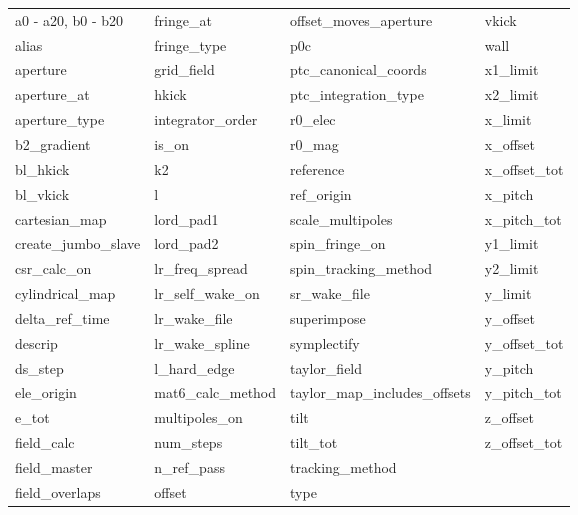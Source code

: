  \begin{tabular}{llll} \toprule
a0 - a20, b0 - b20          & fringe_at                   & offset_moves_aperture       & vkick                       \\
alias                       & fringe_type                 & p0c                         & wall                        \\
aperture                    & grid_field                  & ptc_canonical_coords        & x1_limit                    \\
aperture_at                 & hkick                       & ptc_integration_type        & x2_limit                    \\
aperture_type               & integrator_order            & r0_elec                     & x_limit                     \\
b2_gradient                 & is_on                       & r0_mag                      & x_offset                    \\
bl_hkick                    & k2                          & reference                   & x_offset_tot                \\
bl_vkick                    & l                           & ref_origin                  & x_pitch                     \\
cartesian_map               & lord_pad1                   & scale_multipoles            & x_pitch_tot                 \\
create_jumbo_slave          & lord_pad2                   & spin_fringe_on              & y1_limit                    \\
csr_calc_on                 & lr_freq_spread              & spin_tracking_method        & y2_limit                    \\
cylindrical_map             & lr_self_wake_on             & sr_wake_file                & y_limit                     \\
delta_ref_time              & lr_wake_file                & superimpose                 & y_offset                    \\
descrip                     & lr_wake_spline              & symplectify                 & y_offset_tot                \\
ds_step                     & l_hard_edge                 & taylor_field                & y_pitch                     \\
ele_origin                  & mat6_calc_method            & taylor_map_includes_offsets & y_pitch_tot                 \\
e_tot                       & multipoles_on               & tilt                        & z_offset                    \\
field_calc                  & num_steps                   & tilt_tot                    & z_offset_tot                \\
field_master                & n_ref_pass                  & tracking_method             &                             \\
field_overlaps              & offset                      & type                        &                             \\
 \bottomrule
 \end{tabular}
